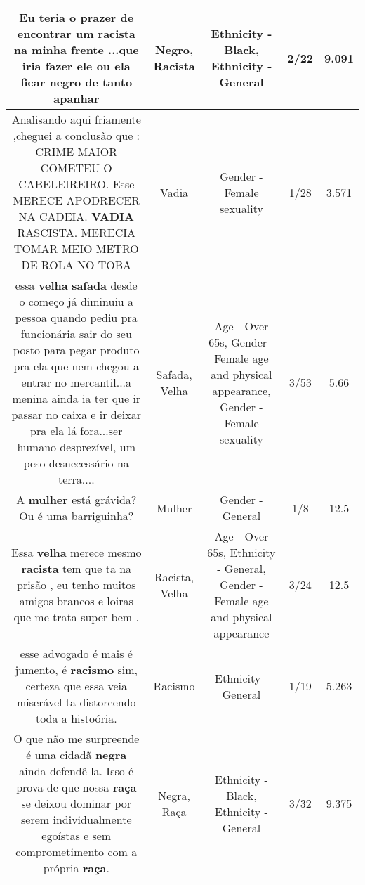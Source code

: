 \documentclass[11pt]{article}
\newlength\mylength
\begin{document}
\begin{center}
\begin{longtable}{|C{.65\mylength}|C{.30\mylength}|C{.12\mylength}|C{.12\mylength}|C{.12\mylength}|}
  \small Eu teria o prazer de encontrar um \textbf{racista} na minha frente ...que iria fazer ele ou ela ficar \textbf{negro} de tanto apanhar\normalsize   & Negro, Racista & Ethnicity - Black, Ethnicity - General & 2/22 & 9.091 \\  \hline
  \small Analisando aqui friamente ,cheguei a conclusão que :  CRIME MAIOR COMETEU O CABELEIREIRO.  Esse MERECE APODRECER NA CADEIA.  \textbf{VADIA} RASCISTA. MERECIA TOMAR MEIO METRO DE ROLA NO TOBA\normalsize   & Vadia & Gender - Female sexuality & 1/28 & 3.571 \\  \hline
  \small essa \textbf{v\textbf{elha}} \textbf{safada} desde o começo já diminuiu a pessoa quando pediu pra funcionária sair do seu posto para pegar produto pra ela que nem chegou a entrar no mercantil...a menina ainda ia ter que ir passar no caixa e ir deixar pra ela lá fora...ser humano desprezível, um peso desnecessário na terra....\normalsize   & Safada, Velha & Age - Over 65s, Gender - Female age and physical appearance, Gender - Female sexuality & 3/53 & 5.66 \\  \hline
  \small A \textbf{mulher} está grávida? Ou é uma barriguinha?\normalsize   & Mulher & Gender - General & 1/8 & 12.5 \\  \hline
  \small Essa \textbf{v\textbf{elha}} merece mesmo \textbf{racista} tem que ta na prisão , eu tenho muitos amigos brancos e loiras que me trata super bem .\normalsize   & Racista, Velha & Age - Over 65s, Ethnicity - General, Gender - Female age and physical appearance & 3/24 & 12.5 \\  \hline
  \small esse advogado é mais é jumento, é \textbf{racismo} sim, certeza que essa veia miserável ta distorcendo toda a histoória.\normalsize   & Racismo & Ethnicity - General & 1/19 & 5.263 \\  \hline
  \small O que não me surpreende é uma cidadã \textbf{negra} ainda defendê-la. Isso é prova de que nossa \textbf{raça} se deixou dominar por serem individualmente egoístas e sem comprometimento com a própria \textbf{raça}.\normalsize   & Negra, Raça & Ethnicity - Black, Ethnicity - General & 3/32 & 9.375 \\  \hline

\end{longtable}
\end{center}
\end{document}
